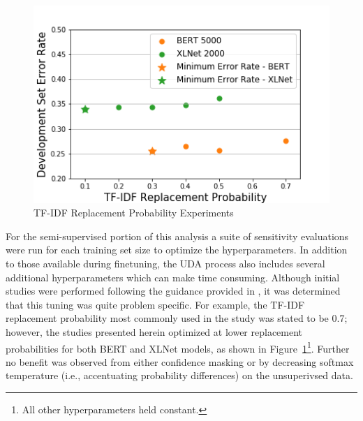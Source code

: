 \documentclass[twoside,twocolumn,10pt]{article}
\begin{document}
\begin{figure}
	\includegraphics[width=\linewidth]{tfidf.png}
	\caption{TF-IDF Replacement Probability Experiments}
	\label{fig:tfidf}
\end{figure}

For the semi-supervised portion of this analysis a suite of sensitivity evaluations were run for each training set size to optimize the hyperparameters. In addition to those available during finetuning, the UDA process also includes several additional hyperparameters which can make time consuming. Although initial studies were performed following the guidance provided in \cite{Xie:2019}, it was determined that this tuning was quite problem specific. For example, the TF-IDF replacement probability most commonly used in the \cite{Xie:2019} study was stated to be 0.7; however, the studies presented herein optimized at lower replacement probabilities for both BERT and XLNet models, as shown in Figure~\ref{fig:tfidf}\footnote{All other hyperparameters held constant.}.  Further no benefit was observed from either confidence masking or by decreasing softmax temperature (i.e., accentuating probability differences) on the unsuperivsed data.



\end{document}
